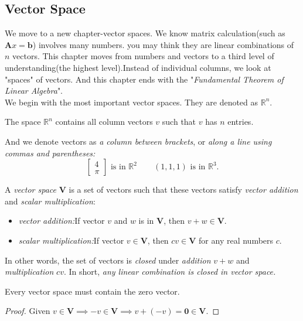 \subsection{Vector Space}
We move to a new chapter-vector spaces. We know matrix calculation(such as $\bm Ax = \bm b$) involves many numbers. you may think they are linear combinations of $n$ vectors.  This chapter moves from numbers and vectors to a third level of understanding(the highest level).Instead of individual columns, we look at  "spaces" of vectors. And this chapter ends with the "\textit{Fundamental Theorem of Linear Algebra}".\\
We begin with the most important vector spaces. They are denoted as $\mathbb{R}^{n}$.
\begin{definition}
The space $\mathbb{R}^{n}$ contains all column vectors $v$ such that $v$ has $n$ entries.
\end{definition}
And we denote vectors as \textit{a
column between brackets}, or \textit{along a line using commas and parentheses:}\\
\[
\begin{bmatrix}
4\\\pi
\end{bmatrix}\text{ is in $\mathbb{R}^{2}$}\qquad(1,1,1)\text{ is in $\mathbb{R}^{3}.$}
\]
\newpage
\enlargethispage{2cm}
\begin{definition}
A \emph{vector space} $\bm V$ is a set of vectors such that these vectors satisfy \textit{vector addition} and \textit{scalar multiplication}:
\begin{itemize}
\item
\emph{vector addition:}If vector $v$ and $w$ is in $\bm V$, then $v+w\in \bm V.$
\item
\emph{scalar multiplication:}If vector $v\in \bm V$, then $cv\in \bm V$ for any real numbers $c$.
\end{itemize}
\end{definition}
In other words, the set of vectors is \emph{closed} under \textit{addition} $v + w$ and \textit{multiplication} $cv$. In short, \emph{any linear combination is closed in vector space.}\\
\begin{proposition}
Every vector space must contain the zero vector.
\end{proposition}
\begin{proof}
Given $v\in\bm V\implies -v\in\bm V\implies v+(-v) = \bm 0\in \bm V.$
\end{proof}
